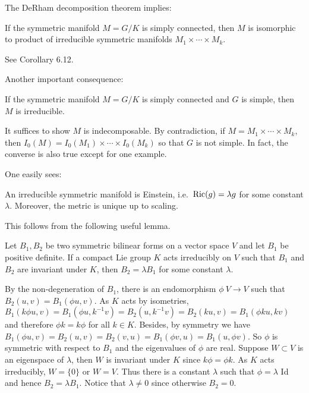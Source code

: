  The DeRham decomposition theorem implies:
 
 \begin{corollary}
 	If the symmetric manifold $M = G / K$ is  simply connected,
 	then $M$ is isomorphic to product of irreducible symmetric
 	manifolds $M_1\times \cdots\times M_k$.
 \end{corollary}
\bproof
See \cite{Ziller} Corollary 6.12.
\eproof
 
 Another important consequence:
 \begin{corollary}
 	If the symmetric manifold $M = G / K$ is simply connected
 	and $G$ is simple, then $M$ is irreducible.
 \end{corollary}
\bproof
It suffices to show $M$ is indecomposable. By contradiction, if
$M = M_{1} \times \cdots \times M_{k}$, then $I_{0}(M) =
{I}_{0}\left( M_{1} \right) \times \cdots \times {I}_{0}\left(
M_{k} \right)$
so that $G$ is not simple. 
\eproof
In fact, the converse is also true  except for one example.

One easily sees:
\begin{corollary}\label{333}
	An irreducible symmetric manifold is Einstein, i.e.\
	$\mathrm{Ric}(g) =  \lambda g$ for some constant $\lambda$.
	Moreover, the metric is unique up to scaling.
\end{corollary}
\bproof
This follows from the following useful lemma.
\eproof
\begin{lemma}
	Let $B_{1}, B_{2}$ be two symmetric bilinear forms on a
	vector space $V$ and let $B_{1}$ be positive definite. If a
	compact Lie group $K$ acts irreducibly on $V$ such that
	$B_{1}$ and $B_{2}$ are invariant under $K$, then $B_{2} =
	\lambda B_{1}$ for some constant $\lambda$.
\end{lemma}
\bproof
By the non-degeneration of $B_{1}$, there is an endomorphism
$\phi\: V \rightarrow V$ such that $B_{2}(u, v) = B_{1}(\phi u,
v) .$ As $K$ acts by isometries, $B_{1}(k \phi u, v) =
B_{1}\left( \phi u, k^{-1} v \right) = B_{2}\left( u, k^{-1} v
\right)=B_{2}(k u, v) = B_{1}(\phi k u, k v)$ and therefore
$\phi k = k \phi$
for all $k \in K$. Besides, by symmetry we have $B_{1}(\phi u,
v) = B_{2}(u, v) = B_{2}(v, u) = B_{1}(\phi v, u) = B_{1}(u,
\phi v)$. So $\phi$ is symmetric with respect to $B_{1}$ and the
eigenvalues of $\phi$ are real. Suppose $W \subset V$ is an
eigenspace of $\lambda$, then $W$ is invariant under $K$ since
$k \phi=\phi k$. As $K$ acts irreducibly, $W = \{0\}$ or $W =
V$. Thus there is a constant $\lambda$ such that $\phi =
\lambda$ Id and hence $B_{2} = \lambda B_{1}$. Notice that
$\lambda \neq 0$ since otherwise
$B_{2} = 0$.
\eproof

